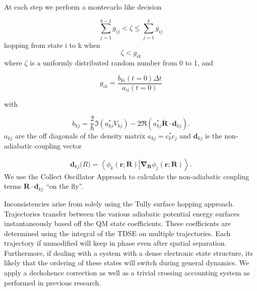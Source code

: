 At each step we perform a montecarlo like decision

\begin{equation} \label{eq:tullyjump2} 
\sum_{j=1}^{k-1}g_{ij} < \zeta  \le \sum_{j=1}^{k}g_{ij}
\end{equation}
hopping from state i to k when
\begin{equation} \label{eq:tullyjump1} 
  \zeta < g_{ik}
\end{equation}
where \(\zeta\) is a uniformly distributed random number from 0 to 1, and

\begin{equation}
g_{ik} = \frac{b_{ki}(t=0)\Delta t}{a_{ii}(t=0)}
\end{equation}

with

\begin{equation} \label{eq:tullyb2a} 
b_{kj} =
        \frac{2}{\hbar}\Im\left(a_{kj}^*V_{kj}\right) - 2\Re\left(a_{kj}^*
         \dot{\mathbf{R}} \cdot \mathbf{d}_{kj}\right).
\end{equation}
$a_{kj}$ are the off diagonals of the density matrix $a_{kj} = c_k^* c_j$ and
$\mathbf{d}_{kj}$ is the non-adiabatic coupling vector

\begin{equation} \label{eq:tullynacoupling} 
\mathbf{d}_{kj}\mathbf(R) =
  \left<\phi_{k}(\mathbf{r};\mathbf{R})\right|\mathbf{\nabla}_{\mathbf{R}}\left.\phi_j(\mathbf{r};\mathbf{R})\right>.
\end{equation}
We use the Collect Oscillator Approach to calculate the non-adiabatic coupling terms \(\mathbf{R} \cdot \mathbf{d}_{kj}\) ``on the
fly''. \cite{tommasini2001electronic, tretiak1996collective, tretiak2009representation, chernyak2000density}

Inconsistencies arise from solely using the Tully surface hopping approach.
Trajectories transfer between  the various adiabatic potential energy surfaces instantaneously based off the QM state coefficients.
These coefficients are determined using the integral of the TDSE on multiple trajectories.
Each trajectory if unmodified will keep in phase even after spatial separation.
Furthermore, if dealing with a system with a dense electronic state structure, its likely that the ordering of these states will switch during general dynamics.
We apply a dechohence correction as well as a trivial crossing accounting system as performed in previous research.

